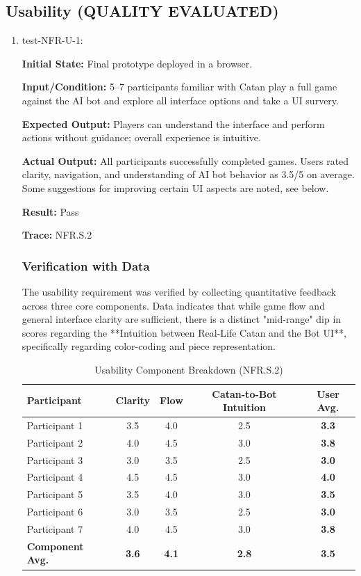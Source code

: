 \documentclass[12pt, titlepage]{article}
\begin{document}
\subsection{Usability (QUALITY EVALUATED)}

\begin{enumerate}
\item test-NFR-U-1:

\textbf{Initial State:} Final prototype deployed in a browser.

\textbf{Input/Condition:} 5--7 participants familiar with Catan play a full game against the AI bot and explore all interface options and take a UI survery.

\textbf{Expected Output:} Players can understand the interface and perform actions without guidance; overall experience is intuitive.

\textbf{Actual Output:} All participants successfully completed games. Users rated clarity, navigation, and understanding of AI bot behavior as 3.5/5 on average. Some suggestions for improving certain UI aspects are noted, see below.

\textbf{Result:} Pass

\textbf{Trace:} NFR.S.2

\subsubsection*{Verification with Data}

The usability requirement was verified by collecting quantitative feedback across three core components. Data indicates that while game flow and general interface clarity are sufficient, there is a distinct "mid-range" dip in scores regarding the **Intuition between Real-Life Catan and the Bot UI**, specifically regarding color-coding and piece representation.

\begin{table}[H]
\centering
\small
\begin{tabular}{|l|c|c|c|c|}
\hline
\textbf{Participant} & \textbf{Clarity} & \textbf{Flow} & \textbf{Catan-to-Bot Intuition} & \textbf{User Avg.} \\ \hline
Participant 1 & 3.5 & 4.0 & 2.5 & \textbf{3.3} \\ \hline
Participant 2 & 4.0 & 4.5 & 3.0 & \textbf{3.8} \\ \hline
Participant 3 & 3.0 & 3.5 & 2.5 & \textbf{3.0} \\ \hline
Participant 4 & 4.5 & 4.5 & 3.0 & \textbf{4.0} \\ \hline
Participant 5 & 3.5 & 4.0 & 3.0 & \textbf{3.5} \\ \hline
Participant 6 & 3.0 & 3.5 & 2.5 & \textbf{3.0} \\ \hline
Participant 7 & 4.0 & 4.5 & 3.0 & \textbf{3.8} \\ \hline
\rowcolor[HTML]{F2F2F2} 
\textbf{Component Avg.} & \textbf{3.6} & \textbf{4.1} & \textbf{2.8} & \textbf{3.5} \\ \hline
\end{tabular}
\caption{Usability Component Breakdown (NFR.S.2)}
\end{table}


\end{enumerate}
\end{document}
